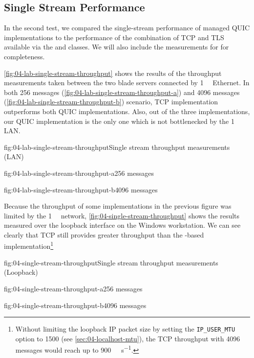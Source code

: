 \subsection{Single Stream Performance}

In the second test, we compared the single-stream performance of managed QUIC implementations to the
performance of the combination of TCP and TLS available via the \TcpClient{} and \SslStream{}
\dotnet{} classes. We will also include the measurements for \libmsquic{} for completeness.

\autoref{fig:04-lab-single-stream-throughput} shows the results of the throughput measurements taken
between the two blade servers connected by \SI{1}{\giga\bit} Ethernet. In both \SI{256}{\byte}
messages (\autoref{fig:04-lab-single-stream-throughput-a}) and \SI{4096}{\byte} messages
(\autoref{fig:04-lab-single-stream-throughput-b}) scenario, TCP implementation outperforms both QUIC
implementations. Also, out of the three implementations, our QUIC implementation is the only one
which is not bottlenecked by the \SI{1}{\giga\bit} LAN\@.

\begin{myFigure}{fig:04-lab-single-stream-throughput}{Single stream throughput measurements (LAN)}
\begin{mySubfigure}{0.49\linewidth}{fig:04-lab-single-stream-throughput-a}{\SI{256}{\byte} messages}
\footnotesize

\end{mySubfigure}
\begin{mySubfigure}{0.49\linewidth}{fig:04-lab-single-stream-throughput-b}{\SI{4096}{\byte} messages}
\footnotesize

\end{mySubfigure}
\end{myFigure}

Because the throughput of some implementations in the previous figure was limited by the
\SI{1}{\giga\bit} network, \autoref{fig:04-single-stream-throughput} shows the results measured over
the loopback interface on the Windows workstation. We can see clearly that TCP still provides
greater throughput than the \libmsquic{}-based implementation\footnote{Without limiting the loopback
IP packet size by setting the \texttt{IP_USER_MTU} option to 1500 (see
\autoref{sec:04-localhost-mtu}), the TCP throughput with \SI{4096}{\byte} messages would reach up to
\SI[per-mode=symbol]{900}{\mebi\byte\per\second}.}

\begin{myFigure}{fig:04-single-stream-throughput}{Single stream throughput measurements (Loopback)}
\begin{mySubfigure}{0.49\linewidth}{fig:04-single-stream-throughput-a}{\SI{256}{\byte} messages}
\footnotesize

\end{mySubfigure}
\begin{mySubfigure}{0.49\linewidth}{fig:04-single-stream-throughput-b}{\SI{4096}{\byte} messages}
\footnotesize

\end{mySubfigure}
\end{myFigure}

